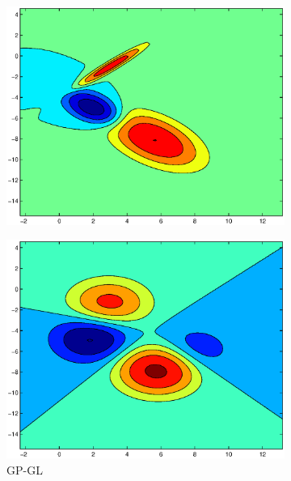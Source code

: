 \documentclass[useAMS,usenatbib,fleqn]{mn2e}
\begin{document}
\begin{figure}
\begin{subfigure}[b]{0.3\columnwidth}
                \includegraphics[width=\textwidth]{figures/GPVC3.eps}
        \end{subfigure}
         \begin{subfigure}[b]{0.3\columnwidth}
                \includegraphics[width=\textwidth]{figures/GPGL4.eps}
                \caption{GP-GL}
        \end{subfigure}
        ~
         \begin{subfigure}[b]{0.3\columnwidth}

\end{subfigure}
\end{figure}
\end{document}
